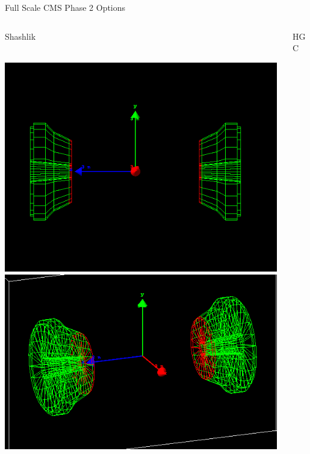 \documentclass[pdf, 9pt]{beamer}
\begin{document}
  \begin{frame}{Full Scale CMS Phase 2 Options}
    \begin{columns}[T]
      \begin{column}{0.5\textwidth}
        \begin{tiny}Shashlik\end{tiny}\\
        \includegraphics[width=0.99\textwidth, height=0.45\textheight]{figs/shashlik_fullscale/SHE_Final.png}\\
        \includegraphics[width=0.99\textwidth, height=0.45\textheight]{figs/shashlik_fullscale/SHE_70_20.png}
      \end{column}
      \begin{column}{0.5\textwidth}
        \begin{tiny}HGC\end{tiny}\\

\end{column}
\end{columns}
\end{frame}
\end{document}
